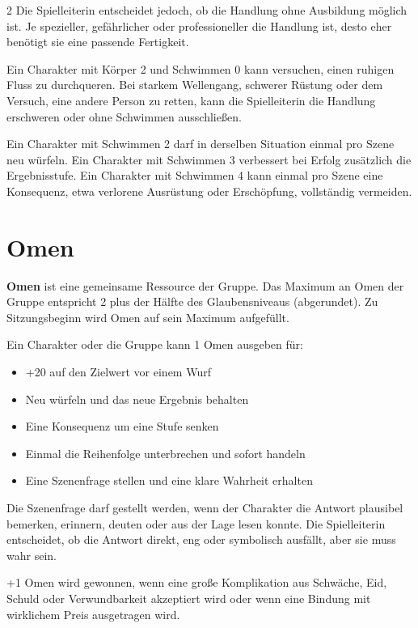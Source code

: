 \begin{multicols*}{2}
Die Spielleiterin entscheidet jedoch, ob die Handlung ohne Ausbildung möglich ist. Je spezieller, gefährlicher oder professioneller die Handlung ist, desto eher benötigt sie eine passende Fertigkeit.

\begin{pexample}
Ein Charakter mit Körper 2 und Schwimmen 0 kann versuchen, einen ruhigen Fluss zu durchqueren. Bei starkem Wellengang, schwerer Rüstung oder dem Versuch, eine andere Person zu retten, kann die Spielleiterin die Handlung erschweren oder ohne Schwimmen ausschließen.

Ein Charakter mit Schwimmen 2 darf in derselben Situation einmal pro Szene neu würfeln. Ein Charakter mit Schwimmen 3 verbessert bei Erfolg zusätzlich die Ergebnisstufe. Ein Charakter mit Schwimmen 4 kann einmal pro Szene eine Konsequenz, etwa verlorene Ausrüstung oder Erschöpfung, vollständig vermeiden.
\end{pexample}

\section{Omen}

\textbf{Omen} ist eine gemeinsame Ressource der Gruppe.
Das Maximum an Omen der Gruppe entspricht 2 plus der Hälfte des Glaubensniveaus (abgerundet).
Zu Sitzungsbeginn wird Omen auf sein Maximum aufgefüllt.

Ein Charakter oder die Gruppe kann 1 Omen ausgeben für:

\begin{itemize}[leftmargin=*]
\item +20 auf den Zielwert vor einem Wurf
\item Neu würfeln und das neue Ergebnis behalten
\item Eine Konsequenz um eine Stufe senken
\item Einmal die Reihenfolge unterbrechen und sofort handeln
\item Eine Szenenfrage stellen und eine klare Wahrheit erhalten
\end{itemize}

Die Szenenfrage darf gestellt werden, wenn der Charakter die Antwort plausibel bemerken, erinnern, deuten oder aus der Lage lesen konnte.
Die Spielleiterin entscheidet, ob die Antwort direkt, eng oder symbolisch ausfällt, aber sie muss wahr sein.

+1 Omen wird gewonnen, wenn eine große Komplikation aus Schwäche, Eid, Schuld oder Verwundbarkeit akzeptiert wird oder wenn eine Bindung mit wirklichem Preis ausgetragen wird.
\end{multicols*}
